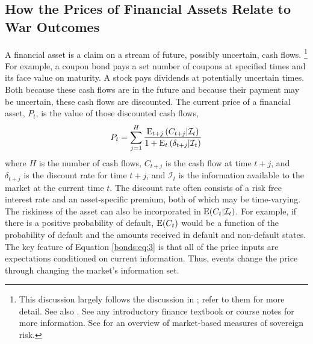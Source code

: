 \subsection{How the Prices of Financial Assets Relate to War Outcomes}
\label{sec:how-prices-financial}

A financial asset is a claim on a stream of future, possibly uncertain, cash flows.%
\footnote{
  This discussion largely follows the discussion in \textcite[673]{GuidolinLaFerrara2010}; refer to them for more detail.
  See also \textcite{HaberMitchenerOosterlinckEtAl2015}.
  See any introductory finance textbook or course notes for more information.
  See \textcite{Chan-Lau2006} for an overview of market-based measures of sovereign risk.
}
For example, a coupon bond pays a set number of coupons at specified times and its face value on maturity.
A stock pays dividends at potentially uncertain times.
Both because these cash flows are in the future and because their payment may be uncertain, these cash flows are discounted.
The current price of a financial asset, $P_{t}$, is the value of those discounted cash flows,
\begin{equation}
  \label{bonds:eq:3}
  P_{t} = \sum_{j = 1}^{H} \frac{\operatorname{E}_{t + j}\left(C_{t + j} | \mathcal{I}_{t}\right)}{1 + \operatorname{E}_{t}\left(\delta_{t+j} | \mathcal{I}_{t}\right)}
\end{equation}
where $H$ is the number of cash flows, $C_{t + j}$ is the cash flow at time $t + j$, and $\delta_{t + j}$ is the discount rate for time $t + j$, and $\mathcal{I}_{t}$ is the information available to the market at the current time $t$.
The discount rate often consists of a risk free interest rate and an asset-specific premium, both of which may be time-varying.
The riskiness of the asset can also be incorporated in $\operatorname{E}(C_{t}| \mathcal{I}_{t})$.
For example, if there is a positive probability of default, $\operatorname{E}(C_{t})$ would be a function of the probability of default and the amounts received in default and non-default states.
The key feature of Equation \eqref{bonds:eq:3} is that all of the price inputs are expectations conditioned on current information.
Thus, events change the price through changing the market's information set. 

